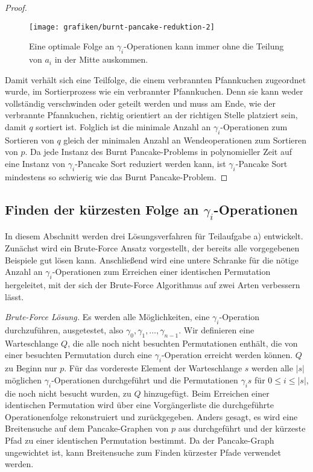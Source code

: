 \documentclass[a4paper, 10pt, ngerman]{article}
\begin{document}
\begin{proof}
    \begin{figure}[H]
        \centering
        \texttt{[image: grafiken/burnt-pancake-reduktion-2]}
        \caption{Eine optimale Folge an $\gamma_i$-Operationen kann immer ohne die Teilung von $a_i$ in der Mitte auskommen.}
    \end{figure}

    Damit verhält sich eine Teilfolge, die einem verbrannten Pfannkuchen zugeordnet wurde, im Sortierprozess wie ein verbrannter Pfannkuchen. Denn sie kann weder vollständig verschwinden oder geteilt werden und muss am Ende, wie der verbrannte Pfannkuchen, richtig orientiert an der richtigen Stelle platziert sein, damit $q$ sortiert ist. Folglich ist die minimale Anzahl an $\gamma_i$-Operationen zum Sortieren von $q$ gleich der minimalen Anzahl an Wendeoperationen zum Sortieren von $p$. Da jede Instanz des Burnt Pancake-Problems in polynomieller Zeit auf eine Instanz von $\gamma_i$-Pancake Sort reduziert werden kann, ist $\gamma_i$-Pancake Sort mindestens so schwierig wie das Burnt Pancake-Problem.
\end{proof}

\subsection{Finden der kürzesten Folge an $\gamma_i$-Operationen}

In diesem Abschnitt werden drei Lösungsverfahren für Teilaufgabe a) entwickelt. Zunächst wird ein Brute-Force Ansatz vorgestellt, der bereits alle vorgegebenen Beispiele gut lösen kann. Anschließend wird eine untere Schranke für die nötige Anzahl an $\gamma_i$-Operationen zum Erreichen einer identischen Permutation hergeleitet, mit der sich der Brute-Force Algorithmus auf zwei Arten verbessern lässt.
\medskip

\emph{Brute-Force Lösung.} Es werden alle Möglichkeiten, eine $\gamma_i$-Operation durchzuführen, ausgetestet, also $\gamma_0, \gamma_1, \dots, \gamma_{n-1}$. Wir definieren eine Warteschlange $Q$, die alle noch nicht besuchten Permutationen enthält, die von einer besuchten Permutation durch eine $\gamma_i$-Operation erreicht werden können. $Q$ zu Beginn nur $p$. Für das vordereste Element der Warteschlange $s$ werden alle $|s|$ möglichen $\gamma_i$-Operationen durchgeführt und die Permutationen $\gamma_i s$ für $0 \le i \le |s|$, die noch nicht besucht wurden, zu $Q$ hinzugefügt. Beim Erreichen einer identischen Permutation wird über eine Vorgängerliste die durchgeführte Operationenfolge rekonstruiert und zurückgegeben. Anders gesagt, es wird eine Breitensuche auf dem Pancake-Graphen von $p$ aus durchgeführt und der kürzeste Pfad zu einer identischen Permutation bestimmt. Da der Pancake-Graph ungewichtet ist, kann Breitensuche zum Finden kürzester Pfade verwendet werden.
\end{document}
